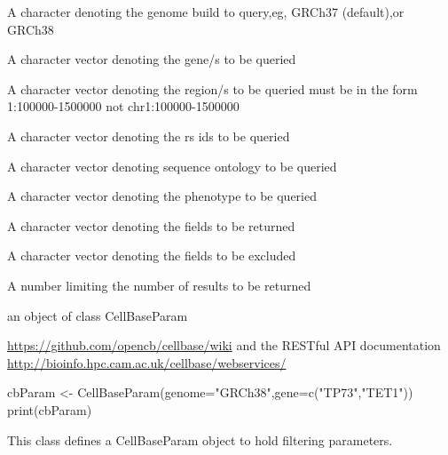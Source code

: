 \documentclass[letterpaper]{book}
\begin{document}
%
\begin{Arguments}
\begin{ldescription}
\item[\code{genome}] A character denoting the genome build to query,eg, GRCh37
(default),or GRCh38

\item[\code{gene}] A character vector denoting the gene/s to be queried

\item[\code{region}] A character vector denoting the region/s to be queried must be
in the form 1:100000-1500000 not chr1:100000-1500000

\item[\code{rs}] A character vector denoting the rs ids to be queried

\item[\code{so}] A character vector denoting sequence ontology to be queried

\item[\code{phenotype}] A character vector denoting the phenotype to be queried

\item[\code{include}] A character vector denoting the fields to be returned

\item[\code{exclude}] A character vector denoting the fields to be excluded

\item[\code{limit}] A number limiting the number of results to be returned
\end{ldescription}
\end{Arguments}
%
\begin{Value}
an object of class CellBaseParam
\end{Value}
%
\begin{SeeAlso}\relax
\url{https://github.com/opencb/cellbase/wiki} 
and the RESTful API documentation 
\url{http://bioinfo.hpc.cam.ac.uk/cellbase/webservices/}
\end{SeeAlso}
%
\begin{Examples}
\begin{ExampleCode}
cbParam <- CellBaseParam(genome="GRCh38",gene=c("TP73","TET1"))
print(cbParam)
\end{ExampleCode}
\end{Examples}
%
\begin{Description}\relax
This class  defines a CellBaseParam object to hold filtering 
parameters.
\end{Description}
\end{document}
